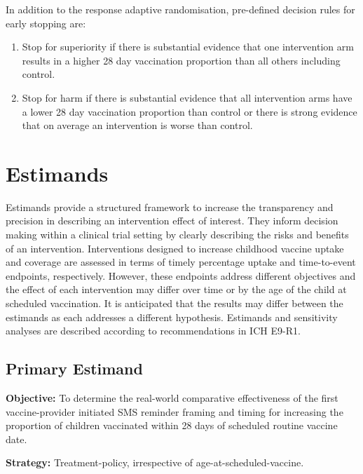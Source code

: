 \documentclass[
  bibliography=totoc]{scrreprt}
\providecommand{\tightlist}{%
  \setlength{\itemsep}{0pt}\setlength{\parskip}{0pt}}
\begin{document}
In addition to the response adaptive randomisation, pre-defined decision rules for early stopping are:

\begin{enumerate}
\def\labelenumi{\arabic{enumi})}
\tightlist
\item
  Stop for superiority if there is substantial evidence that one intervention arm results in a higher 28 day vaccination proportion than all others including control.
\item
  Stop for harm if there is substantial evidence that all intervention arms have a lower 28 day vaccination proportion than control or there is strong evidence that on average an intervention is worse than control.
\end{enumerate}

\hypertarget{estimands}{%
\section{Estimands}\label{estimands}}

Estimands provide a structured framework to increase the transparency and precision in describing an intervention effect of interest.
They inform decision making within a clinical trial setting by clearly describing the risks and benefits of an intervention.
Interventions designed to increase childhood vaccine uptake and coverage are assessed in terms of timely percentage uptake and time-to-event endpoints, respectively.
However, these endpoints address different objectives and the effect of each intervention may differ over time or by the age of the child at scheduled vaccination.
It is anticipated that the results may differ between the estimands as each addresses a different hypothesis.
Estimands and sensitivity analyses are described according to recommendations in ICH E9-R1.

\hypertarget{primary-estimand}{%
\subsection{Primary Estimand}\label{primary-estimand}}

\textbf{Objective:} To determine the real-world comparative effectiveness of the first vaccine-provider initiated SMS reminder framing and timing for increasing the proportion of children vaccinated within 28 days of scheduled routine vaccine date.

\textbf{Strategy:} Treatment-policy, irrespective of age-at-scheduled-vaccine.
\end{document}
